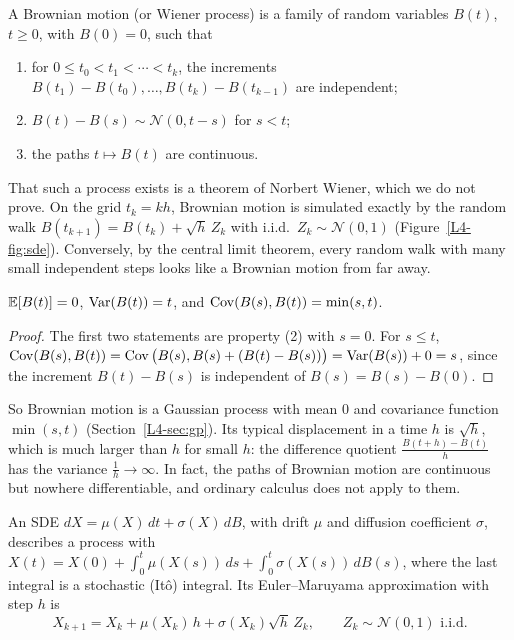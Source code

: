 \begin{definition}\label{L4-def:brownian}
    A Brownian motion (or Wiener process) is a family of random variables $B(t)$, $t \geq 0$, with $B(0) = 0$, such that
    \begin{enumerate}
        \item for $0 \leq t_0 < t_1 < \cdots < t_k$, the increments $B(t_1) - B(t_0), \ldots, B(t_k) - B(t_{k-1})$ are independent;
        \item $B(t) - B(s) \sim \mathcal{N}(0, t - s)$ for $s < t$;
        \item the paths $t \mapsto B(t)$ are continuous.
    \end{enumerate}
\end{definition}

That such a process exists is a theorem of Norbert Wiener, which we do not prove. On the grid $t_k = kh$, Brownian motion is simulated exactly by the random walk $B(t_{k+1}) = B(t_k) + \sqrt{h}\,Z_k$ with i.i.d.\ $Z_k \sim \mathcal{N}(0, 1)$ (Figure~\ref{L4-fig:sde}). Conversely, by the central limit theorem, every random walk with many small independent steps looks like a Brownian motion from far away.

\begin{proposition}\label{L4-prop:brownian}
    $\mathbb{E}[B(t)] = 0$, $\operatorname{Var}(B(t)) = t$, and $\operatorname{Cov}(B(s), B(t)) = \min(s, t)$.
\end{proposition}

\begin{proof}
    The first two statements are property (2) with $s = 0$. For $s \leq t$, $\operatorname{Cov}(B(s), B(t)) = \operatorname{Cov}\big(B(s), B(s) + (B(t) - B(s))\big) = \operatorname{Var}(B(s)) + 0 = s$, since the increment $B(t) - B(s)$ is independent of $B(s) = B(s) - B(0)$.
\end{proof}

So Brownian motion is a Gaussian process with mean $0$ and covariance function $\min(s, t)$ (Section~\ref{L4-sec:gp}). Its typical displacement in a time $h$ is $\sqrt{h}$, which is much larger than $h$ for small $h$: the difference quotient $\frac{B(t + h) - B(t)}{h}$ has the variance $\frac{1}{h} \to \infty$. In fact, the paths of Brownian motion are continuous but nowhere differentiable, and ordinary calculus does not apply to them.

\begin{definition}\label{L4-def:sde}
    An SDE $dX = \mu(X)\,dt + \sigma(X)\,dB$, with drift $\mu$ and diffusion coefficient $\sigma$, describes a process with $X(t) = X(0) + \int_0^t \mu(X(s))\, ds + \int_0^t \sigma(X(s))\, dB(s)$, where the last integral is a stochastic (It\^o) integral. Its Euler--Maruyama approximation with step $h$ is
    \[X_{k+1} = X_k + \mu(X_k)\,h + \sigma(X_k)\sqrt{h}\,Z_k, \qquad Z_k \sim \mathcal{N}(0, 1) \text{ i.i.d.}\]
\end{definition}

